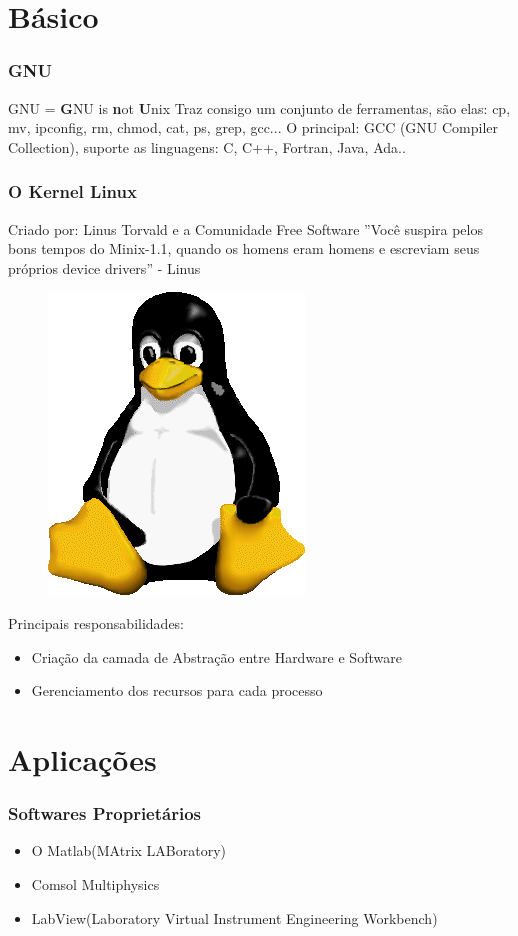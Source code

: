\documentclass{beamer}
\begin{document}
\section{Básico}

\begin{frame}
    \frametitle{GNU}
    GNU = \textbf{G}NU is \textbf{n}ot \textbf{U}nix
    \newline
    \newline
    Traz consigo um conjunto de ferramentas, são elas: cp, mv, ipconfig, rm, chmod, cat, ps, grep, gcc...
    \newline
    \newline
    O principal: GCC (GNU Compiler Collection), suporte as linguagens: C, C++, Fortran, Java, Ada..
\end{frame}

\begin{frame}
    \frametitle{O Kernel Linux}
    Criado por: Linus Torvald e a Comunidade Free Software
    \newline
    \newline
    ''Você suspira pelos bons tempos do Minix-1.1, quando os homens eram homens e escreviam seus próprios device drivers'' - Linus
    \begin{figure}
        \includegraphics[width=.1\linewidth]{logo.png}
    \end{figure}

    Principais responsabilidades:
    \begin{itemize}
        \item Criação da camada de Abstração entre Hardware e Software
        \item Gerenciamento dos recursos para cada processo
    \end{itemize}
\end{frame}

\section{Aplicações}

\begin{frame}

    \frametitle{Softwares Proprietários}
    \begin{itemize}
    \item O Matlab(MAtrix LABoratory)
    \item Comsol Multiphysics
    \item LabView(Laboratory Virtual Instrument Engineering Workbench)
    \end{itemize}
\end{frame}
\end{document}
